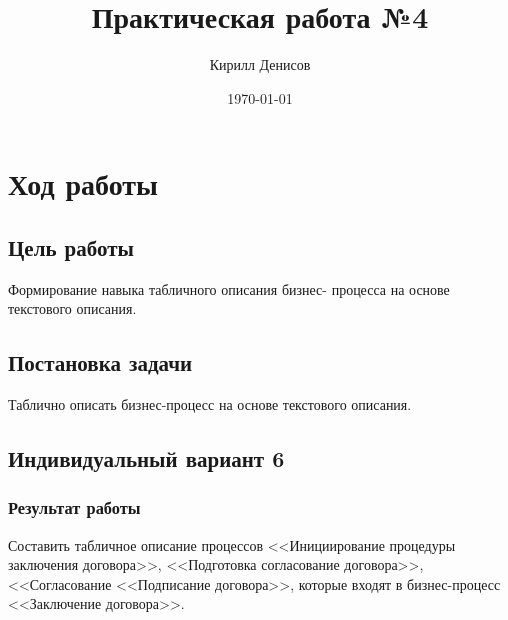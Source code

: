 \documentclass[a4paper,14pt]{extarticle}
\author{Кирилл Денисов}
\title{Практическая работа №4}
\date{\today}
\newcommand{\pathToCommonFolder}{/home/denilai/Documents/repos/latex/Common}
\begin{document}
	\thispagestyle{empty}
	
	\newpage
	\newpage
\section{Ход работы}

\subsection*{Цель работы}
Формирование навыка табличного описания бизнес-
процесса на основе текстового описания.

\subsection*{Постановка задачи}
Таблично описать бизнес-процесс на основе
текстового описания.

\subsection*{Индивидуальный вариант 6}

\subsubsection*{Результат работы}
Составить табличное описание процессов <<Инициирование процедуры
заключения
договора>>,
<<Подготовка
согласование
договора>>,
<<Согласование
<<Подписание договора>>, которые входят в бизнес-процесс <<Заключение
договора>>.
\end{document}

